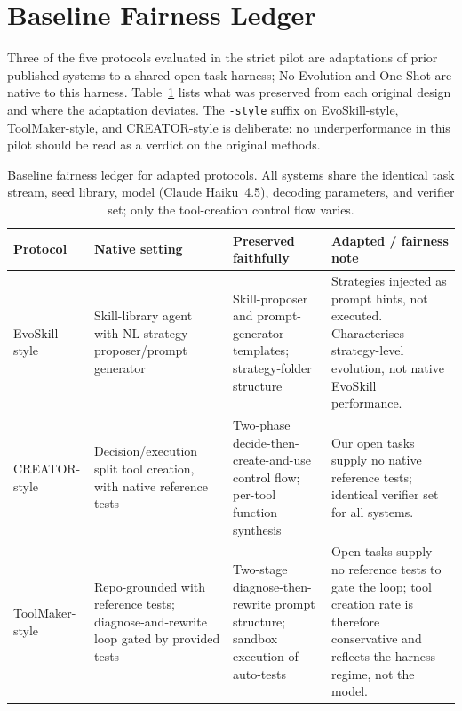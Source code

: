 \documentclass[sigconf,anonymous,review,natbib=false]{acmart}
\begin{document}
\section{Baseline Fairness Ledger}
\label{app:fairness}

Three of the five protocols evaluated in the strict pilot are
adaptations of prior published systems to a shared open-task harness;
No-Evolution and One-Shot are native to this harness.
Table~\ref{tab:baseline_fairness} lists what was preserved from each
original design and where the adaptation deviates. The
\texttt{-style} suffix on EvoSkill-style, ToolMaker-style, and
CREATOR-style is deliberate: no underperformance in this pilot should
be read as a verdict on the original methods.

\begin{table}[h]
\centering\footnotesize
\renewcommand{\arraystretch}{1.2}
\begin{tabular}{p{}p{}p{}p{}}
\toprule
\textbf{Protocol} & \textbf{Native setting} & \textbf{Preserved faithfully} & \textbf{Adapted / fairness note} \\
\midrule
EvoSkill-style & Skill-library agent with NL strategy proposer/prompt generator & Skill-proposer and prompt-generator templates; strategy-folder structure & Strategies injected as prompt hints, not executed. Characterises strategy-level evolution, not native EvoSkill performance. \\
CREATOR-style & Decision/execution split tool creation, with native reference tests & Two-phase decide-then-create-and-use control flow; per-tool function synthesis & Our open tasks supply no native reference tests; identical verifier set for all systems. \\
ToolMaker-style & Repo-grounded with reference tests; diagnose-and-rewrite loop gated by provided tests & Two-stage diagnose-then-rewrite prompt structure; sandbox execution of auto-tests & Open tasks supply no reference tests to gate the loop; tool creation rate is therefore conservative and reflects the harness regime, not the model. \\
\bottomrule
\end{tabular}
\caption{Baseline fairness ledger for adapted protocols. All systems
share the identical task stream, seed library, model
(Claude Haiku~4.5), decoding parameters, and verifier set; only the
tool-creation control flow varies.}
\label{tab:baseline_fairness}
\end{table}
\end{document}
